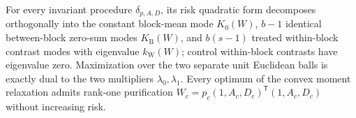 For every invariant procedure \(\delta_{p,A,D}\), its risk quadratic form decomposes orthogonally into the constant block-mean mode \(K_0(W)\), \(b-1\) identical between-block zero-sum modes \(K_{\mathrm B}(W)\), and \(b(s-1)\) treated within-block contrast modes with eigenvalue \(k_{\mathrm W}(W)\); control within-block contrasts have eigenvalue zero. Maximization over the two separate unit Euclidean balls is exactly dual to the two multipliers \(\lambda_0,\lambda_1\). Every optimum of the convex moment relaxation admits rank-one purification \(W_c=p_c(1,A_c,D_c)^{\mathsf T}(1,A_c,D_c)\) without increasing risk.